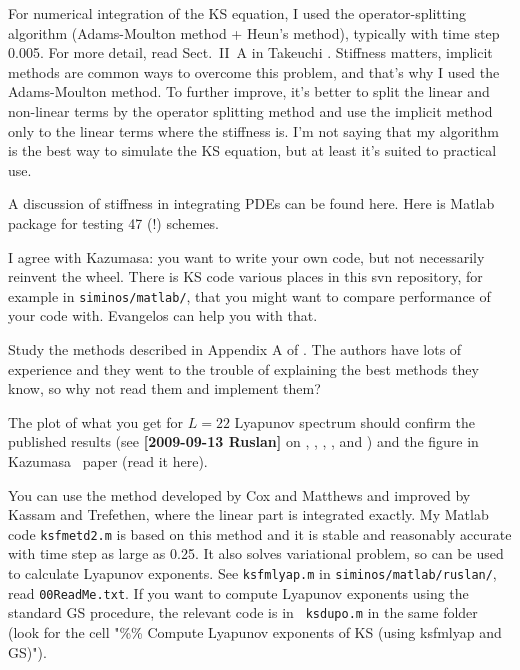 \begin{description}
For numerical integration of the KS equation, I used the
operator-splitting algorithm (Adams-Moulton method + Heun's method),
typically with time step 0.005.
For more detail, read Sect.~II~A in Takeuchi \etal{}.
Stiffness matters, implicit methods are common ways to overcome this problem,
 and that's why I used the Adams-Moulton method.
To further improve, it's better to split the linear and non-linear terms
 by the operator splitting method
 and use the implicit method only to the linear terms where the stiffness is.
I'm not saying that my algorithm is the best way to simulate the KS equation,
 but at least it's suited to practical use.

\item[2013-06-12 Predrag  to Kamal]
A discussion of stiffness in integrating PDEs can be found
{here}.  {Here} is Matlab
package for testing 47 (!) schemes.

I agree with Kazumasa: you want to write your own code,
but not necessarily reinvent the wheel. There is KS code various
places in this svn repository, for example in
\texttt{siminos/matlab/}, that you might want to compare performance
of your code with. Evangelos can help you with that.


Study the methods described in
{Appendix A} of .
The authors have lots of experience and they went to the
    trouble of explaining the best methods they know, so why not read
    them and implement them?

The plot of what you get for $L=22$
Lyapunov spectrum should confirm the published results (see
{\bf [2009-09-13 Ruslan]} on ,
, ,
, and ) and the
figure in Kazumasa \etal\
paper (read it
 {here}).

\item[2013-06-12 Ruslan]
You can use the method developed by Cox and
Matthews and improved by Kassam and
Trefethen, where the linear part is integrated exactly.
My Matlab code {\tt ksfmetd2.m} is based on this method and it is
stable and reasonably accurate with time step as large as 0.25.  It
also solves variational problem, so can be used to calculate Lyapunov
exponents.  See {\tt ksfmlyap.m} in {\tt siminos/matlab/ruslan/},
read {\tt 00ReadMe.txt}.  If you want to compute Lyapunov exponents
using the standard GS procedure, the relevant code is in {\tt
ksdupo.m} in the same folder (look for the cell "\%\% Compute
Lyapunov exponents of KS (using ksfmlyap and GS)").


\end{description}
